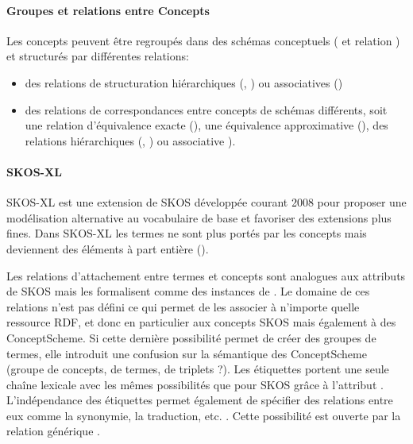 \paragraph{Groupes et relations entre Concepts}
Les concepts peuvent être regroupés dans des schémas conceptuels ( et relation ) et structurés par différentes relations:
\begin{itemize}
	\item des relations de structuration hiérarchiques (, ) ou associatives ()
	\item des relations de correspondances entre concepts de schémas différents, soit une relation d'équivalence exacte (), une équivalence approximative (), des relations hiérarchiques (, ) ou associative ).
\end{itemize}


\paragraph{SKOS-XL}
SKOS-XL est une extension de SKOS développée courant 2008 pour proposer une modélisation alternative au vocabulaire de base et favoriser des extensions plus fines. 
Dans SKOS-XL les termes ne sont plus portés par les concepts mais deviennent des éléments à part entière (). 

Les relations d'attachement entre termes et concepts sont analogues aux attributs de SKOS mais les formalisent comme des instances de . 
Le domaine de ces relations n'est pas défini ce qui permet de les associer à n'importe quelle ressource RDF, et donc en particulier aux concepts SKOS mais également à des ConceptScheme. 
Si cette dernière possibilité permet de créer des groupes de termes, elle introduit une confusion sur la sémantique des ConceptScheme (groupe de concepts, de termes, de triplets ?). 
Les étiquettes portent une seule chaîne lexicale avec les mêmes possibilités que pour SKOS grâce à l'attribut . 
L'indépendance des étiquettes permet également de spécifier des relations entre eux comme la synonymie, la traduction, etc. \cite{Pastor2009a}. 
Cette possibilité est ouverte par la relation générique . 


